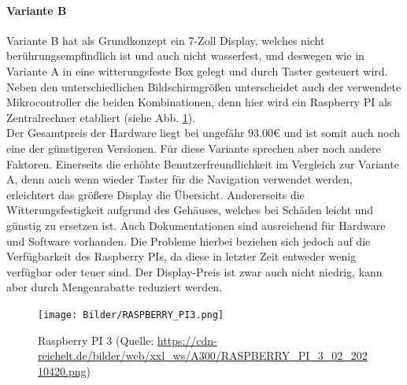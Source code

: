 \paragraph{Variante B}
Variante B hat als Grundkonzept ein 7-Zoll Display, welches nicht berührungsempfindlich ist und auch nicht wasserfest, und deswegen wie in Variante A in eine witterungsfeste Box gelegt und durch Taster gesteuert wird. Neben den unterschiedlichen Bildschirmgrößen unterscheidet auch der verwendete Mikrocontroller die beiden Kombinationen, denn hier wird ein Raspberry PI als Zentralrechner etabliert (siehe Abb. \ref{fig:raspi3}).\\
Der Gesamtpreis der Hardware liegt bei ungefähr 93.00€ und ist somit auch noch eine der günstigeren Versionen. Für diese Variante sprechen aber noch andere Faktoren. Einerseits die erhöhte Benutzerfreundlichkeit im Vergleich zur Variante A, denn auch wenn wieder Taster für die Navigation verwendet werden, erleichtert das größere Display die Übersicht. Andererseits die Witterungsfestigkeit aufgrund des Gehäuses, welches bei Schäden leicht und günstig zu ersetzen ist. Auch Dokumentationen sind ausreichend für Hardware und Software vorhanden. Die Probleme hierbei beziehen sich jedoch auf die Verfügbarkeit des Raspberry PIs, da diese in letzter Zeit entweder wenig verfügbar oder teuer sind. Der Display-Preis ist zwar auch nicht niedrig, kann aber durch Mengenrabatte reduziert werden.
\begin{figure}[ht]
	\centering
	\texttt{[image: Bilder/RASPBERRY\_PI3.png]}
	\caption[Raspberry PI 3 (Quelle: \url{https://cdn-reichelt.de/bilder/web/xxl_ws/A300/RASPBERRY_PI_3_02_20210420.png}, Zugriff am 19.02.2024]{Raspberry PI 3 (Quelle: \url{https://cdn-reichelt.de/bilder/web/xxl_ws/A300/RASPBERRY_PI_3_02_20210420.png})}
	\label{fig:raspi3}
\end{figure}
